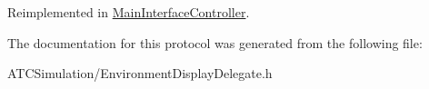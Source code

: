 \-Reimplemented in \hyperlink{interface_main_interface_controller_af31c85000f2413e42fe7dd7d00496145}{\-Main\-Interface\-Controller}.



\-The documentation for this protocol was generated from the following file\-:\begin{DoxyCompactItemize}
\item 
\-A\-T\-C\-Simulation/\-Environment\-Display\-Delegate.\-h\end{DoxyCompactItemize}

